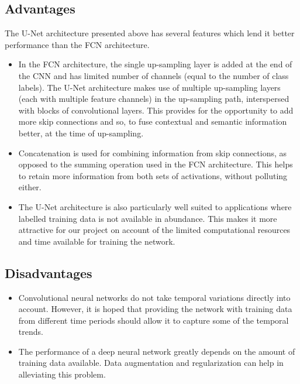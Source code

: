 \documentclass[12pt, a4paper]{report}
\begin{document}
\subsection{Advantages}
The U-Net architecture presented above has several features which lend it better performance than the FCN architecture.
\begin{itemize}
\item
In the FCN architecture, the single up-sampling layer is added at the end of the CNN and has limited number of channels (equal to the number of class labels). The U-Net architecture makes use of multiple up-sampling layers (each with multiple feature channels) in the up-sampling path, interspersed with blocks of convolutional layers. This provides for the opportunity to add more skip connections and so, to fuse contextual and semantic information better, at the time of up-sampling. 
\item
Concatenation is used for combining information from skip connections, as opposed to the summing operation used in the FCN architecture. This helps to retain more information from both sets of activations, without polluting either.
\item
The U-Net architecture is also particularly well suited to applications where labelled training data is not available in abundance. This makes it more attractive for our project on account of the limited computational resources and time available for training the network.
\end{itemize}
\subsection{Disadvantages}
\begin{itemize}
\item Convolutional neural networks do not take temporal variations directly into account. However, it is hoped that providing the network with training data from different time periods should allow it to capture some of the temporal trends.
\item The performance of a deep neural network greatly depends on the amount of training data available. Data augmentation and regularization can help in alleviating this problem.
\end{itemize}
\end{document}
